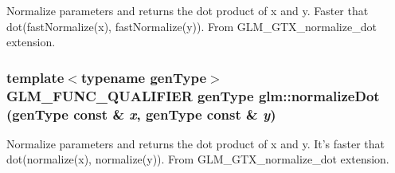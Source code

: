 Normalize parameters and returns the dot product of x and y. Faster that dot(fastNormalize(x), fastNormalize(y)). From GLM\_\-GTX\_\-normalize\_\-dot extension. \hypertarget{group__gtx__normalize__dot_g068b0c92713a438533628dd5d0b581d4}{
\subsubsection[normalizeDot]{\setlength{\rightskip}{0pt plus 5cm}template$<$typename genType$>$ GLM\_\-FUNC\_\-QUALIFIER genType glm::normalizeDot (genType const \& {\em x}, \/  genType const \& {\em y})}}
\label{group__gtx__normalize__dot_g068b0c92713a438533628dd5d0b581d4}


Normalize parameters and returns the dot product of x and y. It's faster that dot(normalize(x), normalize(y)). From GLM\_\-GTX\_\-normalize\_\-dot extension. 